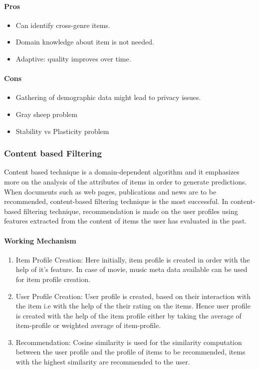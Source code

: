 \paragraph{Pros}\hfill
\begin{itemize}
	\item Can identify cross-genre items.
	\item Domain knowledge about item is not needed.
	\item Adaptive: quality improves over time.
\end{itemize}
\paragraph{Cons}\hfill
\begin{itemize}
	\item Gathering of demographic data might lead to privacy issues.
	\item Gray sheep problem
	\item Stability vs Plasticity problem

\end{itemize}
\subsubsection{Content based Filtering}
Content based technique \cite{recommend} is a domain-dependent algorithm and it emphasizes more on the analysis of the attributes of items in order to generate predictions. When documents such as web pages, publications and news are to be recommended, content-based filtering technique is the most successful. In content-based filtering technique, recommendation is made on the user profiles using features extracted from the content of items the user has evaluated in the past.
\paragraph{Working Mechanism}\hfill

\begin{enumerate}
	\item Item Profile Creation: Here initially, item profile is created in order with the help of it's feature. In case of movie, music meta data available can be used for item profile creation.
	\item User Profile Creation: User profile is created, based on their interaction with the item i.e with the help of the their rating on the items. Hence user profile is created with the help of the item profile either by taking the average of item-profile or weighted average of item-profile.
	\item Recommendation: Cosine similarity is used for the similarity computation between the user profile and the profile of items to be recommended, items with the highest similarity are recommended to the user.
\end{enumerate}

